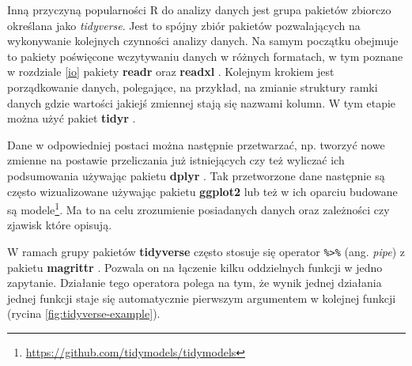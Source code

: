 \documentclass[paper=6in:9in,pagesize=pdftex,headinclude=on,footinclude=on,10pt]{scrbook}
\newenvironment{Shaded}{\begin{snugshade}}{\end{snugshade}}
\newcommand{\DataTypeTok}[1]{\textcolor[rgb]{0.13,0.29,0.53}{#1}}
\newcommand{\KeywordTok}[1]{\textcolor[rgb]{0.13,0.29,0.53}{\textbf{#1}}}
\newcommand{\NormalTok}[1]{#1}
\newcommand{\OperatorTok}[1]{\textcolor[rgb]{0.81,0.36,0.00}{\textbf{#1}}}
\newcommand{\StringTok}[1]{\textcolor[rgb]{0.31,0.60,0.02}{#1}}
\DeclareRobustCommand{\href}[2]{#2\footnote{\url{#1}}}
\begin{document}
Inną przyczyną popularności R do analizy danych jest grupa pakietów zbiorczo określana jako \emph{tidyverse}.
Jest to spójny zbiór pakietów pozwalających na wykonywanie kolejnych czynności analizy danych.
Na samym początku obejmuje to pakiety poświęcone wczytywaniu danych w różnych formatach, w tym poznane w rozdziale \ref{io} pakiety \textbf{readr} \citep{R-readr} oraz \textbf{readxl} \citep{R-readxl}.
Kolejnym krokiem jest porządkowanie danych, polegające, na przykład, na zmianie struktury ramki danych gdzie wartości jakiejś zmiennej stają się nazwami kolumn.
W tym etapie można użyć pakiet \textbf{tidyr} \citep{R-tidyr}.

Dane w odpowiedniej postaci można następnie przetwarzać, np. tworzyć nowe zmienne na postawie przeliczania już istniejących czy też wyliczać ich podsumowania używając pakietu \textbf{dplyr} \citep{R-dplyr}.
Tak przetworzone dane następnie są często wizualizowane używając pakietu \textbf{ggplot2} \citep{R-ggplot2} lub też w ich oparciu budowane są \href{https://github.com/tidymodels/tidymodels}{modele}.
Ma to na celu zrozumienie posiadanych danych oraz zależności czy zjawisk które opisują.

W ramach grupy pakietów \textbf{tidyverse} często stosuje się operator \texttt{\%\textgreater{}\%} (ang. \emph{pipe}) z pakietu \textbf{magrittr} \citep{R-magrittr}.
Pozwala on na łączenie kilku oddzielnych funkcji w jedno zapytanie.
Działanie tego operatora polega na tym, że wynik jednej działania jednej funkcji staje się automatycznie pierwszym argumentem w kolejnej funkcji (rycina \ref{fig:tidyverse-example}).

\begin{Shaded}
\end{Shaded}
\end{document}
